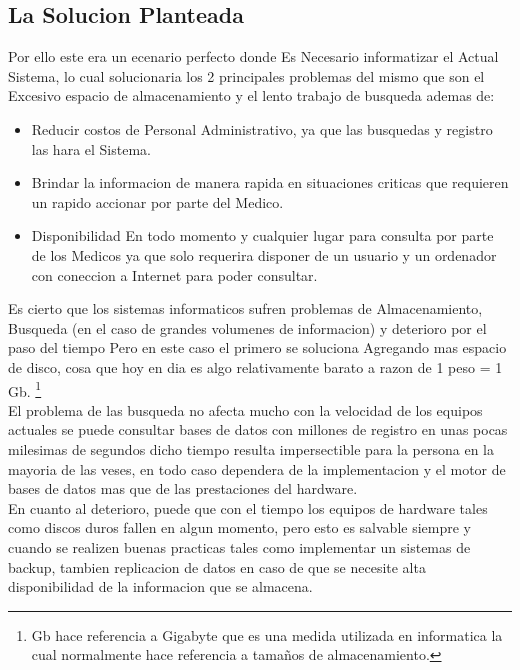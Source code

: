 \subsection{La Solucion Planteada}

Por ello este era un ecenario perfecto donde Es Necesario informatizar el
Actual Sistema, lo cual solucionaria los 2 principales problemas del mismo
que son el Excesivo espacio de almacenamiento y el lento trabajo de busqueda
ademas de:

\begin{itemize}
    \item Reducir costos de Personal Administrativo, ya que las busquedas y
    registro las hara el Sistema.
    \item Brindar la informacion de manera rapida en situaciones criticas que
    requieren un rapido accionar por parte del Medico.
   \item Disponibilidad En todo momento y cualquier lugar para consulta por
    parte de los Medicos ya que solo requerira disponer de un usuario y un
    ordenador con coneccion a Internet para poder consultar.
\end{itemize}

Es cierto que los sistemas informaticos sufren problemas de Almacenamiento, Busqueda
(en el caso de grandes volumenes de informacion) y deterioro por el paso del tiempo
Pero en este caso el primero se soluciona Agregando mas espacio de disco, cosa que
hoy en dia es algo relativamente barato a razon de 1 peso = 1 Gb. \footnote {Gb hace referencia a
Gigabyte que es una medida utilizada en informatica la cual normalmente hace referencia
a tama\~nos de almacenamiento.}  \\[0.1cm]

El problema de las busqueda no afecta mucho con la velocidad de los equipos
actuales se puede consultar bases de datos con millones de registro en unas
pocas milesimas de segundos dicho tiempo resulta impersectible para la persona
en la mayoria de las veses, en todo caso dependera de la implementacion y el
motor de bases de datos mas que de las prestaciones del hardware.\\[0.1cm]

En cuanto al deterioro, puede que con el tiempo los equipos de hardware
tales como discos duros fallen en algun momento, pero esto es salvable siempre y
cuando se realizen buenas practicas tales como implementar un sistemas de backup,
tambien replicacion de datos en caso de que se necesite alta disponibilidad de
la informacion que se almacena.\\[0.1cm]


